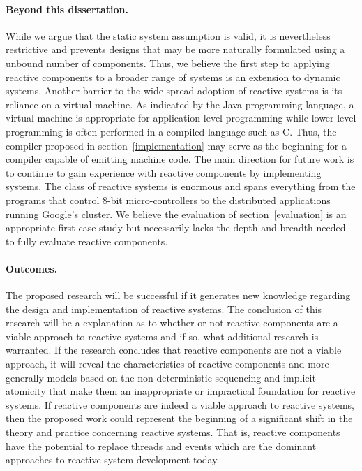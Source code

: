 \paragraph{Beyond this dissertation.}
While we argue that the static system assumption is valid, it is nevertheless restrictive and prevents designs that may be more naturally formulated using a unbound number of components.
Thus, we believe the first step to applying reactive components to a broader range of systems is an extension to dynamic systems.
Another barrier to the wide-spread adoption of reactive systems is its reliance on a virtual machine.
As indicated by the Java programming language, a virtual machine is appropriate for application level programming while lower-level programming is often performed in a compiled language such as C.
Thus, the compiler proposed in section~\ref{implementation} may serve as the beginning for a compiler capable of emitting machine code.
The main direction for future work is to continue to gain experience with reactive components by implementing systems.
The class of reactive systems is enormous and spans everything from the programs that control 8-bit micro-controllers to the distributed applications running Google's cluster.
We believe the evaluation of section~\ref{evaluation} is an appropriate first case study but necessarily lacks the depth and breadth needed to fully evaluate reactive components.

\paragraph{Outcomes.}
The proposed research will be successful if it generates new knowledge regarding the design and implementation of reactive systems.
The conclusion of this research will be a explanation as to whether or not reactive components are a viable approach to reactive systems and if so, what additional research is warranted.
If the research concludes that reactive components are not a viable approach, it will reveal the characteristics of reactive components and more generally models based on the non-deterministic sequencing and implicit atomicity that make them an inappropriate or impractical foundation for reactive systems.
If reactive components are indeed a viable approach to reactive systems, then the proposed work could represent the beginning of a significant shift in the theory and practice concerning reactive systems.
That is, reactive components have the potential to replace threads and events which are the dominant approaches to reactive system development today.
